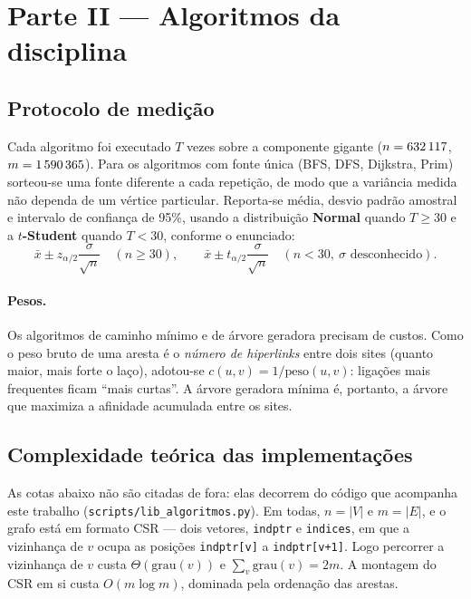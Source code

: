 \documentclass[sigconf]{webmedia}
\begin{document}
\section{Parte II --- Algoritmos da disciplina}
\label{sec:parte2}

\subsection{Protocolo de medição}

Cada algoritmo foi executado $T$ vezes sobre a componente gigante
($n=632\,117{}$, $m=1\,590\,365{}$). Para os algoritmos com fonte única
(BFS, DFS, Dijkstra, Prim) sorteou-se uma fonte diferente a cada repetição,
de modo que a variância medida não dependa de um vértice particular.
Reporta-se média, desvio padrão amostral e intervalo de confiança de 95\%,
usando a distribuição \textbf{Normal} quando $T\geq30$ e a
\textbf{$t$-Student} quando $T<30$, conforme o enunciado:
\[
\bar{x} \pm z_{\alpha/2}\frac{\sigma}{\sqrt{n}}
\quad (n \geq 30), \qquad
\bar{x} \pm t_{\alpha/2}\frac{\sigma}{\sqrt{n}}
\quad (n < 30,\ \sigma \text{ desconhecido}).
\]

\paragraph{Pesos.} Os algoritmos de caminho mínimo e de árvore geradora
precisam de custos. Como o peso bruto de uma aresta é o \emph{número de
hiperlinks} entre dois sites (quanto maior, mais forte o laço), adotou-se
$c(u,v) = 1/\text{peso}(u,v)$: ligações mais frequentes ficam ``mais
curtas''. A árvore geradora mínima é, portanto, a árvore que maximiza a
afinidade acumulada entre os sites.

\subsection{Complexidade teórica das implementações}
\label{sec:complexidade}

As cotas abaixo não são citadas de fora: elas decorrem do código que
acompanha este trabalho (\texttt{scripts/lib\_algoritmos.py}). Em todas,
$n = |V|$ e $m = |E|$, e o grafo está em formato CSR --- dois vetores,
\texttt{indptr} e \texttt{indices}, em que a vizinhança de $v$ ocupa as
posições \texttt{indptr[v]} a \texttt{indptr[v+1]}. Logo percorrer a
vizinhança de $v$ custa $\Theta(\mathrm{grau}(v))$ e
$\sum_v \mathrm{grau}(v) = 2m$. A montagem do CSR em si custa
$O(m\log m)$, dominada pela ordenação das arestas.
\end{document}
